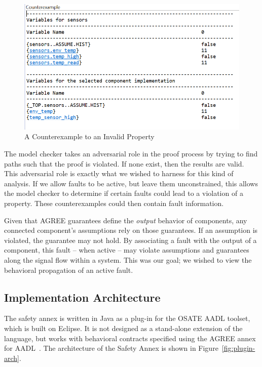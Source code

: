 \begin{figure}[h!]
	\begin{center}
	\includegraphics[width=1.0\textwidth]{images/coex.png}
	\caption{A Counterexample to an Invalid Property}
	\label{fig:coex}
	\end{center}
\end{figure}

The model checker takes an adversarial role in the proof process by trying to find paths such that the proof is violated. If none exist, then the results are valid. This adversarial role is exactly what we wished to harness for this kind of analysis. If we allow faults to be active, but leave them unconstrained, this allows the model checker to determine if certain faults could lead to a violation of a property. These counterexamples could then contain fault information. 

Given that AGREE guarantees define the {\em output} behavior of components, any connected component's assumptions rely on those guarantees. If an assumption is violated, the guarantee may not hold. By associating a fault with the output of a component, this fault -- when active -- may violate assumptions and guarantees along the signal flow within a system. This was our goal; we wished to view the behavioral propagation of an active fault. 

\subsection{Implementation Architecture}
\label{sec:implArchitecture}
The safety annex is written in Java as a plug-in for the OSATE AADL toolset, which is built on Eclipse.  It is not designed as a stand-alone extension of the language, but works with behavioral contracts specified using the AGREE annex for AADL~\cite{NFM2012:CoGaMiWhLaLu}. 
The architecture of the Safety Annex is shown in Figure~\ref{fig:plugin-arch}.

